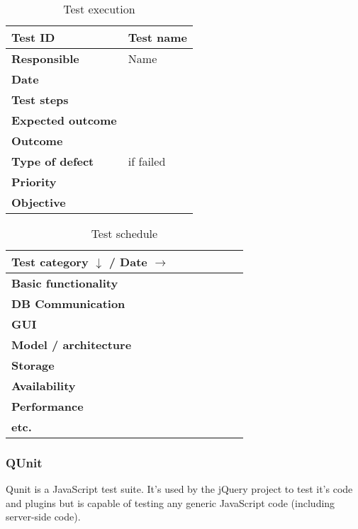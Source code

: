 \begin{table}[htb]
	\centering
    \begin{tabular}{| l | l |}
		\hline
		\textbf{Test ID} & Test name \\ \hline
		\textbf{Responsible} & Name \\ \hline
		\textbf{Date} & \\ \hline
		\textbf{Test steps} & \\ \hline
		\textbf{Expected outcome} & \\ \hline
		\textbf{Outcome} & \\ \hline
		\textbf{Type of defect} & if failed \\ \hline
		\textbf{Priority} & \\ \hline
		\textbf{Objective} &  \\ \hline
    \end{tabular}
  \caption{Test execution}
\end{table}

\begin{table}[htb]
	\centering
    \begin{tabular}{| l | l | l | l | l | l | l |}
		\hline
		\textbf{Test category \(\downarrow\) / Date \(\rightarrow\)} & & & & & & \\ \hline
		\textbf{Basic functionality} & & & & & & \\ \hline
		\textbf{DB Communication} & & & & & & \\ \hline
		\textbf{GUI} & & & & & & \\ \hline
		\textbf{Model / architecture} & & & & & & \\ \hline
		\textbf{Storage} & & & & & & \\ \hline
		\textbf{Availability} & & & & & & \\ \hline
		\textbf{Performance} & & & & & & \\ \hline
		\textbf{etc.} & & & & & & \\ \hline
    \end{tabular}
  \caption{Test schedule}
\end{table}

\subsubsection{QUnit}

	Qunit is a JavaScript test suite. It's used by the jQuery project to test
	it's code and plugins but is capable of testing any generic JavaScript code
	(including server-side code). \cite{jquery:qunit}

